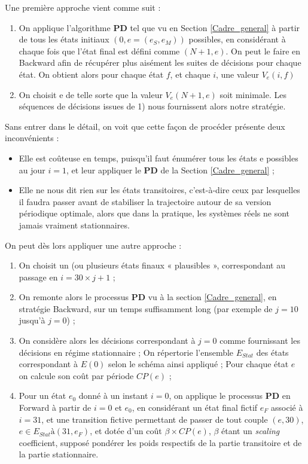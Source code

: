 Une première approche vient comme suit :
\begin{enumerate}
	\item	On applique l'algorithme \textbf{PD}  tel que vu en Section \ref{Cadre_general} à partir de tous les états initiaux $(0, e = (e_S, e_M))$ possibles, en considérant à chaque fois que l'état final est défini comme  $(N+1, e)$. On peut le faire en Backward afin de récupérer plus aisément les suites de décisions pour chaque état. On obtient alors pour chaque état $f$, et chaque $i$, une valeur $V_e(i, f)$
	\item	On choisit e de telle sorte que la valeur $V_e(N+1, e)$ soit minimale. Les séquences de décisions issues de 1) nous fournissent alors notre stratégie.
\end{enumerate}

Sans entrer dans le détail, on voit que cette façon de procéder présente deux inconvénients :

\begin{itemize}[label=$\square$]
	\item	Elle est coûteuse en temps, puisqu'il faut énumérer tous les états e possibles au jour $i = 1$, et leur appliquer le \textbf{PD} de la Section \ref{Cadre_general} ; 
	\item	Elle ne nous dit rien sur les états transitoires, c'est-à-dire ceux par lesquelles il faudra passer avant de stabiliser la trajectoire autour de sa version périodique optimale, alors que dans la pratique, les systèmes réels ne sont jamais vraiment stationnaires.
\end{itemize}

On peut dès lors appliquer une autre approche :
\begin{enumerate}
	\item	On choisit un (ou plusieurs états finaux « plausibles », correspondant au passage en $i = 30 \times j + 1$ ;
	\item	On remonte alors le processus \textbf{PD} vu à la section \ref{Cadre_general}, en stratégie Backward, sur un temps suffisamment long (par exemple de $j = 10 $ jusqu'à $j = 0$) ; 
	\item	On considère alors les décisions correspondant à $j = 0$ comme fournissant les décisions en régime stationnaire ; On répertorie l'ensemble $E_{Stat}$ des états correspondant à $E(0)$ selon le schéma ainsi appliqué ; Pour chaque état $e$ on calcule son coût par période $CP(e)$ ; 
	\item	Pour un état $e_0$ donné à un instant $i = 0$,  on applique le processus \textbf{PD} en Forward à partir de $i = 0$ et $e_0$, en considérant un état final fictif $e_F$ associé à $i = 31$, et une transition fictive permettant de passer de tout couple $(e, 30)$, $e \in E_{Stat}  à (31, e_F)$, et dotée d'un coût $\beta \times CP(e)$, $\beta$ étant un \textit{scaling} coefficient, supposé pondérer les poids respectifs de la partie transitoire et de la partie stationnaire. 
\end{enumerate}

